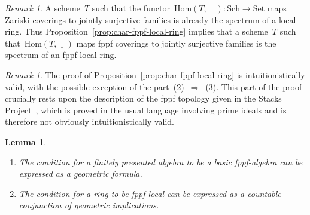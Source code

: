 \documentclass[10pt,reqno,a4paper]{amsbook}
\theoremstyle{definition}
\theoremstyle{plain}
\newtheorem{lemma}[defn]{Lemma}
\theoremstyle{remark}
\newtheorem{rem}[defn]{Remark}
\newcommand{\Hom}{\mathrm{Hom}}
\newcommand{\placeholder}{\underline{\quad}}
\newcommand{\Set}{\mathrm{Set}}
\newcommand{\Sch}{\mathrm{Sch}}
\newcommand{\?}{\,{:}\,}
\renewcommand{\_}{\mathpunct{.}\,}
\newcommand{\stacksproject}[1]{\cite[{\href{https://stacks.math.columbia.edu/tag/#1}{Tag~#1}}]{stacks-project}}
\begin{document}
\begin{rem}A scheme~$T$ such that the functor~$\Hom(T, \placeholder) :
\Sch \to \Set$ maps Zariski coverings to jointly surjective
families is already the spectrum of a local ring. Thus
Proposition~\ref{prop:char-fppf-local-ring} implies that a scheme~$T$ such
that~$\Hom(T, \placeholder)$ maps fppf coverings to jointly surjective families
is the spectrum of an fppf-local ring.\end{rem}

\begin{rem}The proof of Proposition~\ref{prop:char-fppf-local-ring} is
intuitionistically valid, with the possible exception of the
part~(2)~$\Rightarrow$~(3). This part of the proof crucially rests upon
the description of the fppf topology given in the Stacks
Project~\stacksproject{05WN}, which is proved in the usual language
involving prime ideals and is therefore not obviously intuitionistically valid.
\end{rem}

\begin{lemma}\label{lemma:basic-fppf-algebra-geometric}
\begin{enumerate}
\item The condition for a finitely presented algebra to be a basic fppf-algebra can
be expressed as a geometric formula.
\item The condition for a ring to be fppf-local can be expressed as a
countable conjunction of geometric implications.
\end{enumerate}
\end{lemma}
\end{document}
